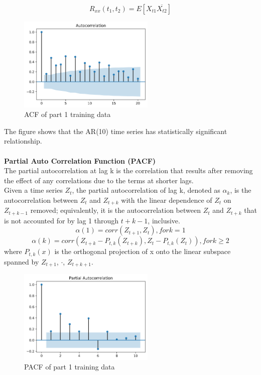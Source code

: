 \documentclass{article}
\begin{document}
\begin{equation}
	R_{xx}(t_{1}, t_{2}) = E[X_{t1}\overline{X_{t2}}]
\end{equation}

\begin{figure}[htbp]\centering
	\includegraphics[width=6.5cm]{ACF.png}
	\caption{ACF of part 1 training data}
	\label{fig: ACF}
\end{figure}

The figure shows that the AR(10) time series has statistically significant relationship.
\\
\\
\textbf{Partial Auto Correlation Function (PACF)}\\
The partial autocorrelation at lag k is the correlation that results after removing the effect of any correlations due to the terms at shorter lags.\\
Given a time series $Z_{t}$, the partial autocorrelation of lag k, denoted as $\alpha_{k}$, is the autocorrelation between $Z_{t}$ and $Z_{t+k}$ with the linear dependence of $Z_{t}$ on $Z_{t+k-1}$ removed;
equivalently, it is the autocorrelation between $Z_{t}$ and $Z_{t+k}$ that is not accounted for by lag 1 through $t+k-1$, inclusive.\\
\begin{equation}
	\alpha(1) = corr(Z_{t+1}, Z_{t}), for k = 1
\end{equation}
\begin{equation}
	\alpha(k) = corr(Z_{t+k} - P_{t,k}(Z_{t+k}), Z_{t} - P_{t,k}(Z_{t})), for k \geq 2
\end{equation}
where $P_{t,k} (x)$ is the orthogonal projection of x onto the linear subspace spanned by $Z_{t+1}$, $\cdot$, $Z_{t+k+1}$.

\begin{figure}[htbp]\centering
	\includegraphics[width=6.5cm]{PACF.png}
	\caption{PACF of part 1 training data}
	\label{fig: PACF}
\end{figure}
\end{document}
